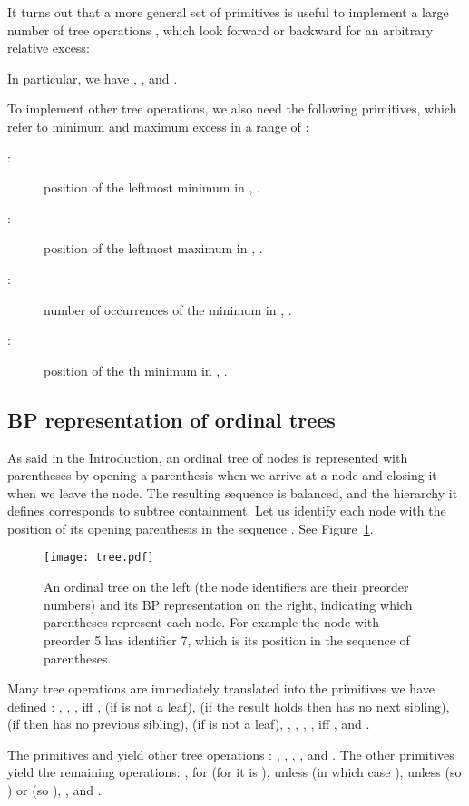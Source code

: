 \documentclass[11pt]{article}
\newcommand{\0}{\mathit{0}}
\newcommand{\1}{\mathit{1}}
\begin{document}
It turns out that a more general set of primitives is useful to implement a
large number of tree operations \cite{NS14}, which look forward or backward
for an arbitrary relative excess:

In particular, we have , 
, and .

To implement other tree operations, we also need the following primitives,
which refer to minimum and maximum excess in a range of :
\begin{description}
\item[:] position of the leftmost minimum in ,
.
\item[:] position of the leftmost maximum in ,
.
\item[:] number of occurrences of the minimum in ,
.
\item[:] position of the th minimum in ,
.
\end{description}

\subsection{BP representation of ordinal trees}

As said in the Introduction, an ordinal tree of  nodes is represented with
 parentheses by opening a parenthesis when we arrive at a node and closing
it when we leave the node. The resulting sequence is balanced, and the
hierarchy it defines corresponds to subtree containment. Let us identify
each node with the position of its opening parenthesis in the sequence .
See Figure~\ref{fig:tree}.

\begin{figure}[t]
\centerline{\texttt{[image: tree.pdf]}}
\caption{An ordinal tree on the left (the node identifiers are their preorder
numbers) and its BP representation on the right, indicating which parentheses
represent each node. For example the node with preorder 5 has identifier 7,
which is its position in the sequence of parentheses.}
\label{fig:tree}
\end{figure}

Many tree operations are immediately translated into the primitives 
we have defined \cite{MR01}: ,
, ,
 iff ,  (if  is not a leaf),
 (if the result  holds  then  has no
next sibling),  (if  then  has no
previous sibling),  (if  is not a leaf),
, ,
, ,
 iff , and .

The primitives  and  yield other tree 
operations \cite{NS14}: ,
,
,
, and
.
The other primitives yield the remaining operations:
,
 for 
(for  it is ),
 unless 
(in which case ),
 unless 
(so ) or  (so ),
, and
.
\end{document}
